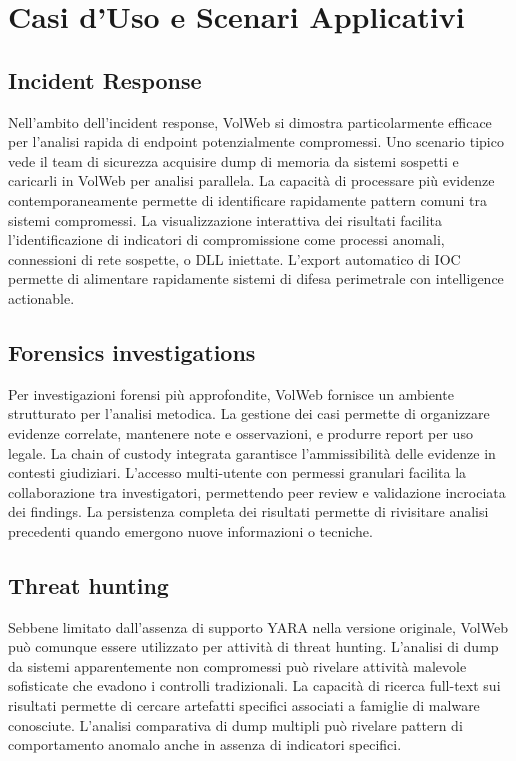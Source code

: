 \section{Casi d'Uso e Scenari Applicativi}
\subsection{Incident Response}
Nell'ambito dell'incident response, VolWeb si dimostra particolarmente efficace per l'analisi rapida di endpoint potenzialmente compromessi. Uno scenario tipico vede il team di sicurezza acquisire dump di memoria da sistemi sospetti e caricarli in VolWeb per analisi parallela. La capacità di processare più evidenze contemporaneamente permette di identificare rapidamente pattern comuni tra sistemi compromessi.
La visualizzazione interattiva dei risultati facilita l'identificazione di indicatori di compromissione come processi anomali, connessioni di rete sospette, o DLL iniettate. L'export automatico di IOC permette di alimentare rapidamente sistemi di difesa perimetrale con intelligence actionable.

\subsection{Forensics investigations}
Per investigazioni forensi più approfondite, VolWeb fornisce un ambiente strutturato per l'analisi metodica. La gestione dei casi permette di organizzare evidenze correlate, mantenere note e osservazioni, e produrre report per uso legale. La chain of custody integrata garantisce l'ammissibilità delle evidenze in contesti giudiziari.
L'accesso multi-utente con permessi granulari facilita la collaborazione tra investigatori, permettendo peer review e validazione incrociata dei findings. La persistenza completa dei risultati permette di rivisitare analisi precedenti quando emergono nuove informazioni o tecniche.

\subsection{Threat hunting}
Sebbene limitato dall'assenza di supporto YARA nella versione originale, VolWeb può comunque essere utilizzato per attività di threat hunting. L'analisi di dump da sistemi apparentemente non compromessi può rivelare attività malevole sofisticate che evadono i controlli tradizionali.
La capacità di ricerca full-text sui risultati permette di cercare artefatti specifici associati a famiglie di malware conosciute. L'analisi comparativa di dump multipli può rivelare pattern di comportamento anomalo anche in assenza di indicatori specifici.


